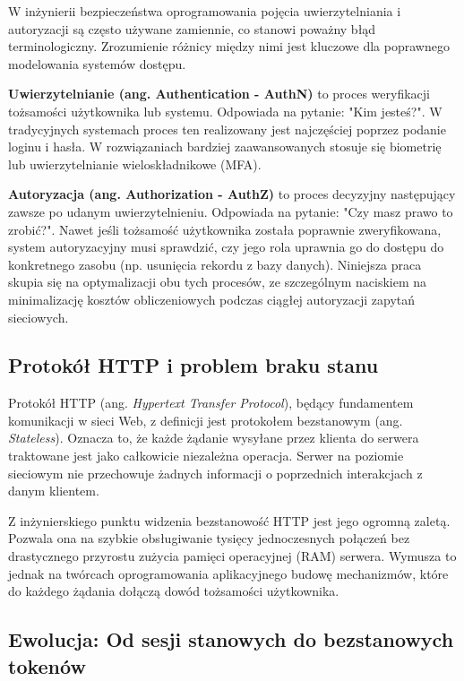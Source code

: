 \documentclass{SGGW-thesis}
\begin{document}
W inżynierii bezpieczeństwa oprogramowania pojęcia uwierzytelniania i autoryzacji są często używane zamiennie, co stanowi poważny błąd terminologiczny. Zrozumienie różnicy między nimi jest kluczowe dla poprawnego modelowania systemów dostępu.

\textbf{Uwierzytelnianie (ang. Authentication - AuthN)} to proces weryfikacji tożsamości użytkownika lub systemu. Odpowiada na pytanie: "Kim jesteś?". W tradycyjnych systemach proces ten realizowany jest najczęściej poprzez podanie loginu i hasła. W rozwiązaniach bardziej zaawansowanych stosuje się biometrię lub uwierzytelnianie wieloskładnikowe (MFA).

\textbf{Autoryzacja (ang. Authorization - AuthZ)} to proces decyzyjny następujący zawsze po udanym uwierzytelnieniu. Odpowiada na pytanie: "Czy masz prawo to zrobić?". Nawet jeśli tożsamość użytkownika została poprawnie zweryfikowana, system autoryzacyjny musi sprawdzić, czy jego rola uprawnia go do dostępu do konkretnego zasobu (np. usunięcia rekordu z bazy danych). Niniejsza praca skupia się na optymalizacji obu tych procesów, ze szczególnym naciskiem na minimalizację kosztów obliczeniowych podczas ciągłej autoryzacji zapytań sieciowych.

\subsection{Protokół HTTP i problem braku stanu}

Protokół HTTP (ang. \textit{Hypertext Transfer Protocol}), będący fundamentem komunikacji w sieci Web, z definicji jest protokołem bezstanowym (ang. \textit{Stateless}). Oznacza to, że każde żądanie wysyłane przez klienta do serwera traktowane jest jako całkowicie niezależna operacja. Serwer na poziomie sieciowym nie przechowuje żadnych informacji o poprzednich interakcjach z danym klientem.

Z inżynierskiego punktu widzenia bezstanowość HTTP jest jego ogromną zaletą. Pozwala ona na szybkie obsługiwanie tysięcy jednoczesnych połączeń bez drastycznego przyrostu zużycia pamięci operacyjnej (RAM) serwera. Wymusza to jednak na twórcach oprogramowania aplikacyjnego budowę mechanizmów, które do każdego żądania dołączą dowód tożsamości użytkownika.

\subsection{Ewolucja: Od sesji stanowych do bezstanowych tokenów}
\end{document}
